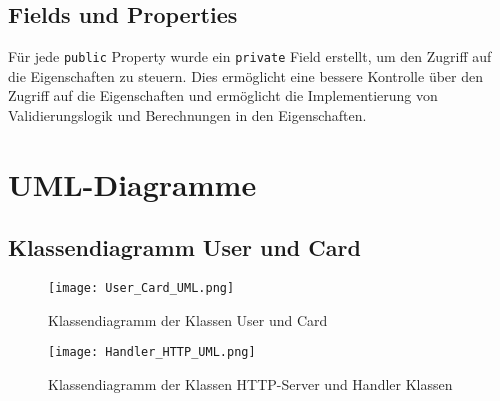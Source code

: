 \documentclass[a4paper, 12pt]{article}
\begin{document}
\subsection{Fields und Properties}
Für jede \texttt{public} Property wurde ein \texttt{private} Field erstellt, um den Zugriff auf die Eigenschaften zu steuern. Dies ermöglicht eine bessere Kontrolle über den Zugriff auf die Eigenschaften und ermöglicht die Implementierung von Validierungslogik und Berechnungen in den Eigenschaften.

\pagebreak

\section{UML-Diagramme}
\subsection{Klassendiagramm User und Card}
\begin{figure}[h]
    \centering
    \texttt{[image: User\_Card\_UML.png]}
    \caption{Klassendiagramm der Klassen User und Card}
\end{figure}

\begin{figure} [h]
    \centering
    \texttt{[image: Handler\_HTTP\_UML.png]}
    \caption{Klassendiagramm der Klassen HTTP-Server und Handler Klassen}
\end{figure}
\end{document}
